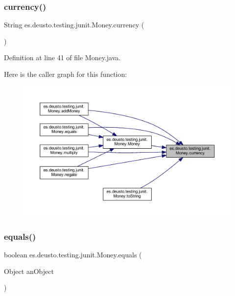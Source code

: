 \mbox{\label{classes_1_1deusto_1_1testing_1_1junit_1_1_money_aefa4aaf62bb653eae25851d98ae02dcb}} 
\subsubsection{\texorpdfstring{currency()}{currency()}}
{\footnotesize\ttfamily String es.\+deusto.\+testing.\+junit.\+Money.\+currency (\begin{DoxyParamCaption}{ }\end{DoxyParamCaption})}



Definition at line 41 of file Money.\+java.

Here is the caller graph for this function\+:
\nopagebreak
\begin{figure}[H]
\begin{center}
\leavevmode
\includegraphics[width=350pt]{classes_1_1deusto_1_1testing_1_1junit_1_1_money_aefa4aaf62bb653eae25851d98ae02dcb_icgraph}
\end{center}
\end{figure}
\mbox{\label{classes_1_1deusto_1_1testing_1_1junit_1_1_money_a2356df38b8e9ecdd969bab11d6dd301b}} 
\subsubsection{\texorpdfstring{equals()}{equals()}}
{\footnotesize\ttfamily boolean es.\+deusto.\+testing.\+junit.\+Money.\+equals (\begin{DoxyParamCaption}\item[{Object}]{an\+Object }\end{DoxyParamCaption})}



